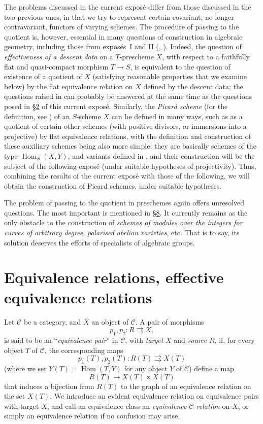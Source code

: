 \documentclass{article}
\renewcommand{\cal}[1]{{\mathcal{#1}}}
\DeclareMathOperator{\Hom}{Hom}
\newcommand{\oldpage}[1]{\marginpar{\footnotesize$\Big\vert$ \textit{p.~#1}}}
\begin{document}
The problems discussed in the current expos\'{e} differ from those discussed in the two previous ones, in that we try to represent certain covariant, no longer contravariant, functors of varying schemes.
The procedure of passing to the quotient is, however, essential in many questions of construction in algebraic geometry, including those from expos\'{e}s~I and II (\cite{1}, \cite{2}).
Indeed, the question of \emph{effectiveness of a descent data} on a $T$-prescheme $X$, with respect to a faithfully flat and quasi-compact morphism $T\to S$, is equivalent to the question of existence of a quotient of $X$ (satisfying reasonable properties that we examine below) by the flat equivalence relation on $X$ defined by the descent data;
the questions raised in \cite[A.2.c]{1} can probably be answered at the same time as the questions posed in \hyperref[2]{\S2} of this current expos\'{e}.
Similarly, the \emph{Picard scheme} (for the definition, see \cite[C.3]{2}) of an $S$-scheme $X$ can be defined in many ways, such as as a quotient of certain other schemes (with positive divisors, or immersions into a projective) by flat equivalence relations, with the definition and construction of these auxiliary schemes being also more simple: they are basically schemes of the type $\Hom_S(X,Y)$, and variants defined in \cite[C.2]{2}, and their construction will be the subject of the following expos\'{e} (under suitable hypotheses of projectivity).
Thus, combining the results of the current expos\'{e} with those of the following, we will obtain the construction of Picard schemes, under suitable hypotheses.

The problem of passing to the quotient in preschemes again offers unresolved questions.
The most important is mentioned in \hyperref[8]{\S8}.
It currently remains as the only obstacle to the construction of \emph{schemes of modules over the integers for curves of arbitrary degree}, \emph{polarised abelian varieties}, etc.
That is to say, its solution deserves the efforts of specialists of algebraic groups.


\oldpage{212-02}
\section{Equivalence relations, effective equivalence relations}

Let $\cal{C}$ be a category, and $X$ an object of $\cal{C}$.
A pair of morphisms
\[
  p_1,p_2\colon R\rightrightarrows X,
\]
is said to be an ``\emph{equivalence pair}'' in $\cal{C}$, with \emph{target} $X$ and \emph{source} $R$, if, for every object $T$ of $\cal{C}$, the corresponding maps
\[
  p_1(T),p_2(T)\colon R(T)\rightrightarrows X(T)
\]
(where we set $Y(T)=\Hom(T,Y)$ for any object $Y$ of $\cal{C}$) define a map
\[
  R(T)\to X(T)\times X(T)
\]
that induces a bijection from $R(T)$ to the graph of an equivalence relation on the set $X(T)$.
We introduce an evident equivalence relation on equivalence pairs with target $X$, and call an equivalence class an \emph{equivalence $\cal{C}$-relation} on $X$, or simply an equivalence relation if no confusion may arise.
\end{document}
